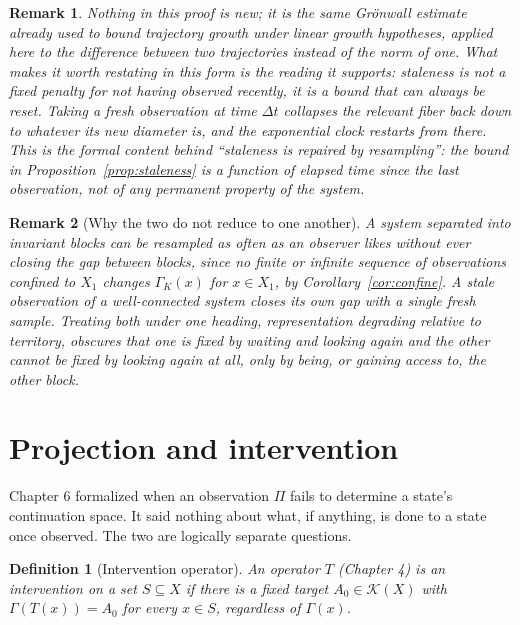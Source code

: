 \documentclass[11pt]{report}
\newtheorem{definition}{Definition}[chapter]
\newtheorem{remark}{Remark}[chapter]
\begin{document}
\begin{remark}
Nothing in this proof is new; it is the same Gr\"onwall estimate
already used to bound trajectory growth under linear growth
hypotheses, applied here to the \emph{difference} between two
trajectories instead of the norm of one. What makes it worth restating
in this form is the reading it supports: staleness is not a fixed
penalty for not having observed recently, it is a bound that can
always be reset. Taking a fresh observation at time $\Delta t$
collapses the relevant fiber back down to whatever its new diameter
is, and the exponential clock restarts from there. This is the formal
content behind ``staleness is repaired by resampling'': the bound in
Proposition~\ref{prop:staleness} is a function of elapsed time since
the \emph{last} observation, not of any permanent property of the
system.
\end{remark}

\begin{remark}[Why the two do not reduce to one another]
A system separated into invariant blocks can be resampled as often as an
observer likes without ever closing the gap between blocks, since no
finite or infinite sequence of observations confined to $X_1$ changes
$\Gamma_K(x)$ for $x \in X_1$, by Corollary~\ref{cor:confine}. A stale
observation of a well-connected system closes its own gap with a
single fresh sample. Treating both under one heading, representation
degrading relative to territory, obscures that one is fixed by waiting
and looking again and the other cannot be fixed by looking again at
all, only by being, or gaining access to, the other block.
\end{remark}

\section*{Projection and intervention}

Chapter 6 formalized when an observation $\Pi$ fails to determine a
state's continuation space. It said nothing about what, if anything,
is done to a state once observed. The two are logically separate
questions.

\begin{definition}[Intervention operator]
An operator $T$ (Chapter 4) is an intervention on a set $S \subseteq
X$ if there is a fixed target $A_0 \in \mathcal{K}(X)$ with $\Gamma(T(x))
= A_0$ for every $x \in S$, regardless of $\Gamma(x)$.
\end{definition}
\end{document}
